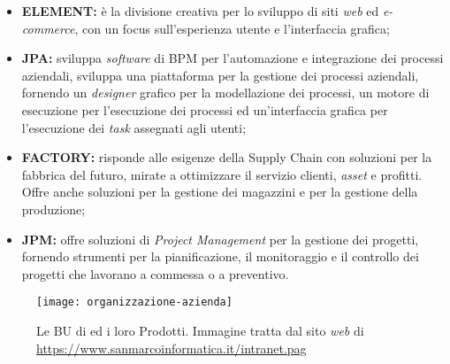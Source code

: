 \begin{itemize}
\item \textbf{ELEMENT:} è la divisione creativa per lo sviluppo di siti \textit{web} ed \textit{e-commerce}, con un focus sull'esperienza utente e l'interfaccia grafica;
\item \textbf{JPA:} sviluppa \textit{software} di \gls{BPM} per l'automazione e integrazione dei processi aziendali, sviluppa una piattaforma per la gestione dei processi aziendali, fornendo un \textit{designer}  grafico per la modellazione dei processi, un motore di esecuzione per l'esecuzione dei processi ed un'interfaccia grafica per l'esecuzione dei \textit{task} assegnati agli utenti;
\item \textbf{FACTORY:} risponde alle esigenze della \gls{Supply Chain} con soluzioni per la fabbrica del futuro, mirate a ottimizzare il servizio clienti, \textit{asset} e profitti. Offre anche soluzioni per la gestione dei magazzini e per la gestione della produzione; 
\item \textbf{JPM:} offre soluzioni di \textit{\gls{Project Management}} per la gestione dei progetti, fornendo strumenti per la pianificazione, il monitoraggio e il controllo dei progetti che lavorano a commessa o a preventivo.
\end{itemize}

\begin{figure}[!h] 
  \centering 
  \texttt{[image: organizzazione-azienda]} 
  \caption{Le BU di {\azienda} ed i loro Prodotti. Immagine tratta dal sito \textit{web} di \azienda{} \url{https://www.sanmarcoinformatica.it/intranet.pag}}
  \label{fig:organizzazione-azienda}
\end{figure}
\newpage

